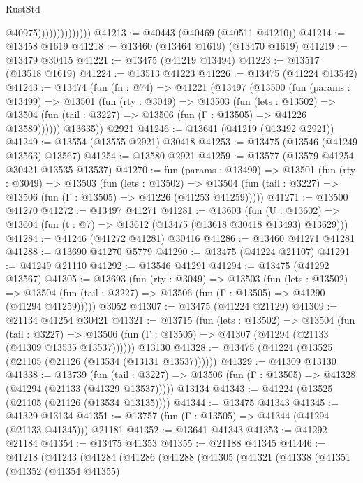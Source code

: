 \begin{lexlean}{RustStd}
\begin{coremodule}
                                @40975))))))))))))))
@41213 := @40443 (@40469 (@40511 @41210))
@41214 := @13458 @1619
@41218 := @13460 (@13464 @1619) (@13470 @1619)
@41219 := @13479 @30415
@41221 := @13475 (@41219 @13494)
@41223 := @13517 (@13518 @1619)
@41224 := @13513 @41223
@41226 := @13475 (@41224 @13542)
@41243 := @13474
    (fun (fn : @74) =>
    @41221
      (@13497
        (@13500
          (fun (params : @13499) =>
          @13501
            (fun (rty : @3049) =>
            @13503
              (fun (lets : @13502) =>
              @13504 (fun (tail : @3227) => @13506 (fun (Γ : @13505) => @41226 @13589))))))
        @13635))
    @2921
@41246 := @13641 (@41219 (@13492 @2921))
@41249 := @13554 (@13555 @2921) @30418
@41253 := @13475 (@13546 (@41249 @13563) @13567)
@41254 := @13580 @2921
@41259 := @13577 (@13579 @41254 @30421 @13535 @13537)
@41270 := fun (params : @13499) =>
  @13501
    (fun (rty : @3049) =>
    @13503
      (fun (lets : @13502) =>
      @13504 (fun (tail : @3227) => @13506 (fun (Γ : @13505) => @41226 (@41253 @41259)))))
@41271 := @13500 @41270
@41272 := @13497 @41271
@41281 := @13603
    (fun (U : @13602) => @13604 (fun (t : @7) => @13612 (@13475 (@13618 @30418 @13493) @13629)))
@41284 := @41246 (@41272 @41281) @30416
@41286 := @13460 @41271 @41281
@41288 := @13690 @41270 @5779
@41290 := @13475 (@41224 @21107)
@41291 := @41249 @21110
@41292 := @13546 @41291
@41294 := @13475 (@41292 @13567)
@41305 := @13693
    (fun (rty : @3049) =>
    @13503
      (fun (lets : @13502) =>
      @13504 (fun (tail : @3227) => @13506 (fun (Γ : @13505) => @41290 (@41294 @41259)))))
    @3052
@41307 := @13475 (@41224 @21129)
@41309 := @21134 @41254 @30421
@41321 := @13715
    (fun (lets : @13502) =>
    @13504
      (fun (tail : @3227) =>
      @13506 (fun (Γ : @13505) => @41307 (@41294 (@21133 (@41309 @13535 @13537))))))
    @13130
@41328 := @13475 (@41224 (@13525 (@21105 (@21126 (@13534 (@13131 @13537))))))
@41329 := @41309 @13130
@41338 := @13739
    (fun (tail : @3227) => @13506 (fun (Γ : @13505) => @41328 (@41294 (@21133 (@41329 @13537)))))
    @13134
@41343 := @41224 (@13525 (@21105 (@21126 (@13534 @13135))))
@41344 := @13475 @41343
@41345 := @41329 @13134
@41351 := @13757 (fun (Γ : @13505) => @41344 (@41294 (@21133 @41345))) @21181
@41352 := @13641 @41343
@41353 := @41292 @21184
@41354 := @13475 @41353
@41355 := @21188 @41345
@41446 := @41218
    (@41243
      (@41284
        (@41286
          (@41288
            (@41305
              (@41321
                (@41338
                  (@41351
                    (@41352
                      (@41354 @41355)

\end{coremodule}
\end{lexlean}
